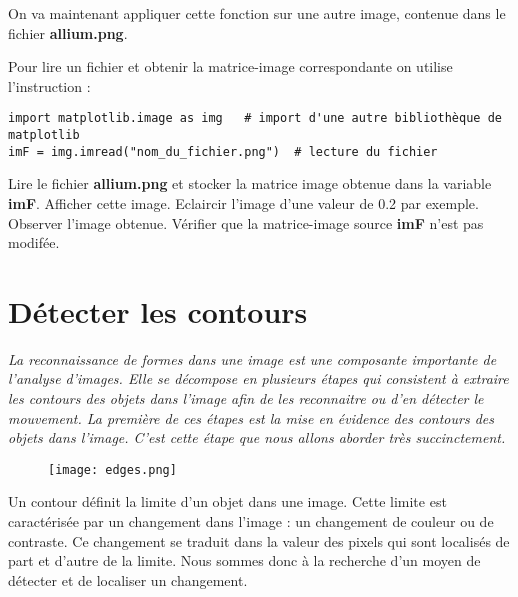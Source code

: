 
On va maintenant appliquer cette fonction sur une autre image, contenue dans le fichier \textbf{allium.png}.

Pour lire un fichier et obtenir la matrice-image correspondante on utilise l'instruction :
\begin{lstlisting}
import matplotlib.image as img   # import d'une autre bibliothèque de matplotlib
imF = img.imread("nom_du_fichier.png")  # lecture du fichier
\end{lstlisting}


 
\begin{question}
Lire le fichier \textbf{allium.png} et stocker la matrice image obtenue dans la variable \textbf{imF}. Afficher cette image. Eclaircir l'image d'une valeur de 0.2 par exemple. Observer l'image obtenue. Vérifier que la matrice-image source \textbf{imF} n'est pas modifée. 
\end{question}



\section*{Détecter les contours}

\textit{La reconnaissance de formes dans une image est une composante importante de l'analyse d'images.
Elle se décompose en plusieurs étapes qui consistent à extraire les contours des objets dans l'image afin
de les reconnaitre ou d'en détecter le mouvement. La première de ces étapes est la mise en évidence
des contours des objets dans l'image. C'est cette étape que nous allons aborder très succinctement.}


\begin{figure}[!h]
\centering
\texttt{[image: edges.png]}
\end{figure}

Un contour définit la limite d'un objet dans une image. Cette limite est caractérisée par un changement
dans l'image : un changement de couleur ou de contraste. Ce changement se traduit dans la valeur des pixels qui sont localisés de part et d’autre de la limite.
Nous sommes donc à la recherche d’un moyen de détecter et de localiser un changement.

